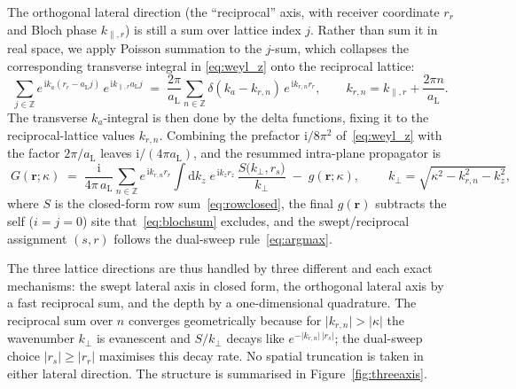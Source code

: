 \documentclass[11pt,a4paper]{article}
\newcommand{\rd}{\mathrm{d}}
\newcommand{\ii}{\mathrm{i}}
\newcommand{\vr}{\mathbf{r}}
\newcommand{\kperp}{k_{\perp}}
\newcommand{\aL}{a_{\mathrm{L}}}
\begin{document}
The orthogonal lateral direction (the ``reciprocal'' axis, with receiver
coordinate $r_r$ and Bloch phase $k_{\parallel,r}$) is still a sum over lattice
index $j$. Rather than sum it in real space, we apply Poisson summation to the
$j$-sum, which collapses the corresponding transverse integral in
\eqref{eq:weyl_z} onto the reciprocal lattice:
\begin{equation}
  \sum_{j\in\mathbb{Z}} e^{\,\ii k_a(r_r-\aL j)}\,e^{\,\ii k_{\parallel,r}\aL j}
  \;=\;\frac{2\pi}{\aL}\sum_{n\in\mathbb{Z}}
        \delta\!\left(k_a-k_{r,n}\right)\,e^{\,\ii k_{r,n} r_r},
  \qquad
  k_{r,n}=k_{\parallel,r}+\frac{2\pi n}{\aL}.
  \label{eq:poisson}
\end{equation}
The transverse $k_a$-integral is then done by the delta functions, fixing it to
the reciprocal-lattice values $k_{r,n}$. Combining the prefactor $\ii/8\pi^2$
of~\eqref{eq:weyl_z} with the factor $2\pi/\aL$ leaves $\ii/(4\pi\aL)$, and the
resummed intra-plane propagator is
\begin{equation}
  \boxed{\;
  G(\vr;\kappa)
  \;=\;\frac{\ii}{4\pi\,\aL}
       \sum_{n\in\mathbb{Z}} e^{\,\ii k_{r,n} r_r}
       \int \rd k_z\; e^{\,\ii k_z r_z}\,
       \frac{S\!\bigl(\kperp,r_s\bigr)}{\kperp}
       \;-\;g(\vr;\kappa),\;}
  \qquad
  \kperp=\sqrt{\kappa^{2}-k_{r,n}^{2}-k_z^{2}},
  \label{eq:fieldsweep}
\end{equation}
where $S$ is the closed-form row sum~\eqref{eq:rowclosed}, the final $g(\vr)$
subtracts the self ($i=j=0$) site that~\eqref{eq:blochsum} excludes, and the
swept/reciprocal assignment $(s,r)$ follows the dual-sweep rule~\eqref{eq:argmax}.

The three lattice directions are thus handled by three different and each
exact mechanisms: the swept lateral axis in closed form, the orthogonal lateral
axis by a fast reciprocal sum, and the depth by a one-dimensional quadrature.
The reciprocal sum over $n$ converges geometrically because for
$\lvert k_{r,n}\rvert>\lvert\kappa\rvert$ the wavenumber $\kperp$ is evanescent
and $S/\kperp$ decays like $e^{-\lvert k_{r,n}\rvert\,\lvert r_s\rvert}$; the
dual-sweep choice $\lvert r_s\rvert\ge\lvert r_r\rvert$ maximises this decay
rate. No spatial truncation is taken in either lateral direction. The structure
is summarised in Figure~\ref{fig:threeaxis}.
\end{document}
